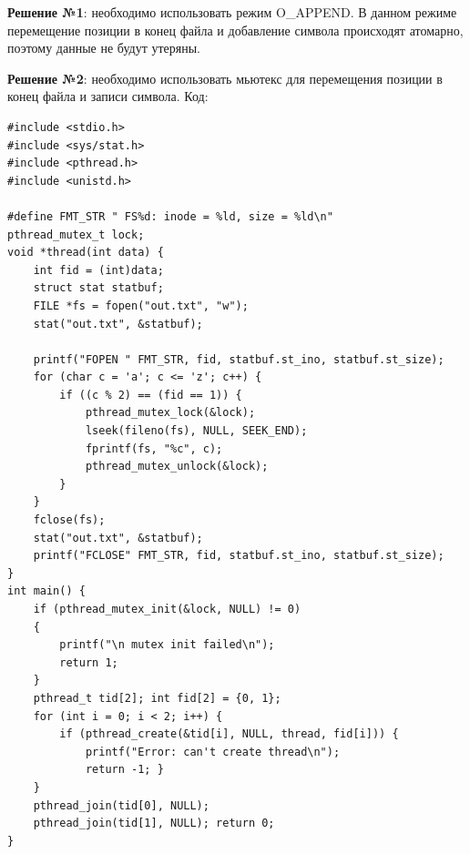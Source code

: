 \documentclass[12pt]{report}
\begin{document}
\textbf{Решение №1}: необходимо использовать режим O\_APPEND. В данном режиме перемещение позиции в конец файла и добавление символа происходят атомарно, поэтому данные не будут утеряны. 

\textbf{Решение №2}: необходимо использовать мьютекс для перемещения позиции в конец файла и записи символа. Код:
\begin{lstlisting}
#include <stdio.h>
#include <sys/stat.h>
#include <pthread.h>
#include <unistd.h>

#define FMT_STR " FS%d: inode = %ld, size = %ld\n"
pthread_mutex_t lock;
void *thread(int data) {
    int fid = (int)data;
    struct stat statbuf;
    FILE *fs = fopen("out.txt", "w");
    stat("out.txt", &statbuf);

    printf("FOPEN " FMT_STR, fid, statbuf.st_ino, statbuf.st_size);
    for (char c = 'a'; c <= 'z'; c++) {
        if ((c % 2) == (fid == 1)) {
            pthread_mutex_lock(&lock);
            lseek(fileno(fs), NULL, SEEK_END);
            fprintf(fs, "%c", c);
            pthread_mutex_unlock(&lock);
        }
    }
    fclose(fs);
    stat("out.txt", &statbuf);
    printf("FCLOSE" FMT_STR, fid, statbuf.st_ino, statbuf.st_size);
}
int main() {
    if (pthread_mutex_init(&lock, NULL) != 0)
    {
        printf("\n mutex init failed\n");
        return 1;
    }
    pthread_t tid[2]; int fid[2] = {0, 1};
    for (int i = 0; i < 2; i++) {
        if (pthread_create(&tid[i], NULL, thread, fid[i])) {
            printf("Error: can't create thread\n");
            return -1; }
    }
    pthread_join(tid[0], NULL);
    pthread_join(tid[1], NULL); return 0;
}
\end{lstlisting}
\newpage
\end{document}
